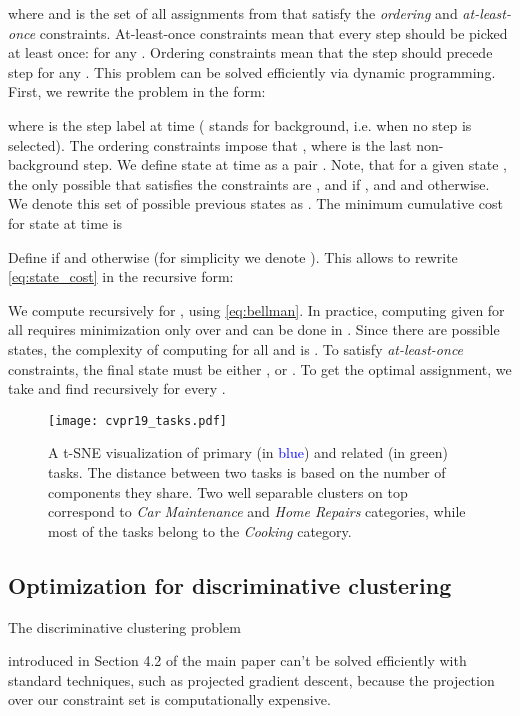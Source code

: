 \documentclass[10pt,twocolumn,letterpaper]{article}
\begin{document}
where  and  is the set of all assignments from  that satisfy the {\em ordering} and {\em at-least-once} constraints.
At-least-once constraints mean that every step  should be picked at least once:  for any .
Ordering constraints mean that the step  should precede step  for any .
This problem can be solved efficiently via dynamic programming.
First, we rewrite the problem in the form:

where  is the step label at time  ( stands for background, i.e. when no step is selected).
The ordering constraints impose that , where  is the last non-background step.
We define state  at time  as a pair .
Note, that for a given state , the only possible  that satisfies the constraints are ,  and  if , and  and  otherwise.
We denote this set of possible previous states as .
The minimum cumulative cost for state  at time  is


Define  if  and  otherwise (for simplicity we denote ). This allows to rewrite \eqref{eq:state_cost} in the recursive form:


We compute  recursively for , using \eqref{eq:bellman}.
In practice, computing  given  for all  requires minimization only over  and can be done in .
Since there are  possible states, the complexity of computing  for all  and  is .
To satisfy {\em at-least-once} constraints, the final state  must be either , or .
To get the optimal assignment, we take  and find  recursively for every .


\begin{figure*}[t]
\begin{center}
   \texttt{[image: cvpr19\_tasks.pdf]}
   \caption{A t-SNE visualization of primary (in \textcolor{blue}{blue}) and related (in \textcolor{dark-green}{green}) tasks. The distance between two tasks is based on the number of components they share. Two well separable clusters on top correspond to {\em Car Maintenance} and {\em Home Repairs} categories, while most of the tasks belong to the {\em Cooking} category.}
   \label{fig:tasks}
\end{center}
\vspace{-0.2in}
\end{figure*}


\subsection{Optimization for discriminative clustering}
\label{subsec:dc_optim}
The discriminative clustering problem

introduced in Section 4.2 of the main paper can't be solved efficiently with
standard techniques, such as projected gradient descent, because the projection
over our constraint set  is computationally expensive.
\end{document}
